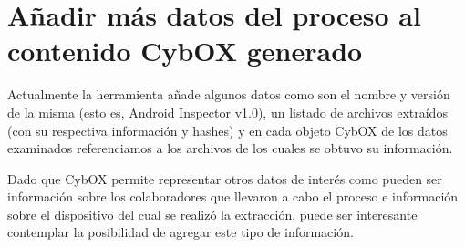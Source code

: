 \section{Añadir más datos del proceso al contenido CybOX generado}
Actualmente la herramienta añade algunos datos como son el nombre y versión de la misma (esto es, Android Inspector v1.0), un listado de archivos extraídos (con su respectiva información y hashes) y en cada objeto CybOX de los datos examinados referenciamos a los archivos de los cuales se obtuvo su información.

Dado que CybOX permite representar otros datos de interés como pueden ser información sobre los colaboradores que llevaron a cabo el proceso e información sobre el dispositivo del cual se realizó la extracción, puede ser interesante contemplar la posibilidad de agregar este tipo de información. 